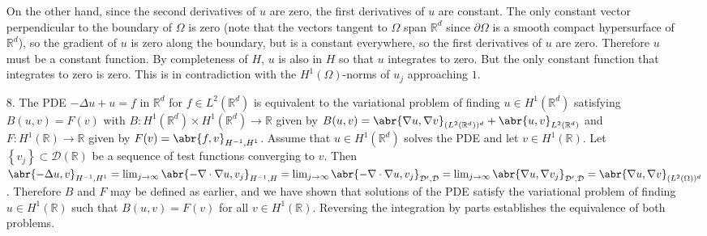 \documentclass[11pt,leqno]{article}
\theoremstyle{plain}
\theoremstyle{definition}
\numberwithin{equation}{section}
\numberwithin{lem}{section}
\newcommand{\cbr}[1]{\left\{#1\right\}}
\begin{document}
\begin{enumerate}
    On the other hand, since the second derivatives of $u$ are zero, the first derivatives of $u$ are constant. The only constant vector perpendicular to the boundary of $\Omega$ is zero (note that the vectors tangent to $\Omega$ span $\mathbb R^d$ since $\partial \Omega$ is a smooth compact hypersurface of $\mathbb R^d$), so the gradient of $u$ is zero along the boundary, but is a constant everywhere, so the first derivatives of $u$ are zero. Therefore $u$ must be a constant function. By completeness of $H$, $u$ is also in $H$ so that $u$ integrates to zero. But the only constant function that integrates to zero is zero. This is in contradiction with the $H^1(\Omega)$-norms of $u_j$ approaching $1$.
    
    \item[8.] The PDE $-\Delta u + u = f$ in $\mathbb R^d$ for $f\in L^2(\mathbb R^d)$ is equivalent to the variational problem of finding $u\in H^1(\mathbb R^d)$ satisfying $B(u,v) = F(v)$ with $B\colon H^1(\mathbb R^d)\times H^1(\mathbb R^d)\to \mathbb R$ given by $B(u,v) = \abr{\nabla u,\nabla v}_{(L^2(\mathbb R^d))^d} + \abr{u,v}_{L^2(\mathbb R^d)}$ and $F\colon H^1(\mathbb R)\to\mathbb R$ given by $F(v) = \abr{f,v}_{H^{-1},H^1}$. Assume that $u\in H^1(\mathbb R^d)$ solves the PDE and let $v\in H^1(\mathbb R)$. Let $\cbr{v_j}\subset\mathcal D(\mathbb R)$ be a sequence of test functions converging to $v$. Then $\abr{-\Delta u,v}_{H^{-1},H^1} = \lim_{j\to\infty}\abr{-\nabla\cdot\nabla u,v_j}_{H^{-1},H} = \lim_{j\to\infty}\abr{-\nabla\cdot\nabla u,v_j}_{\mathcal D^{\prime},\mathcal D} = \lim_{j\to\infty}\abr{\nabla u,\nabla v_j}_{\mathcal D^{\prime},\mathcal D} = \abr{\nabla u,\nabla v}_{(L^2(\Omega))^d}$. Therefore $B$ and $F$ may be defined as earlier, and we have shown that solutions of the PDE satisfy the variational problem of finding $u\in H^1(\mathbb R)$ such that $B(u,v) = F(v)$ for all $v\in H^1(\mathbb R)$. Reversing the integration by parts establishes the equivalence of both problems. 
    

\end{enumerate}
\end{document}
